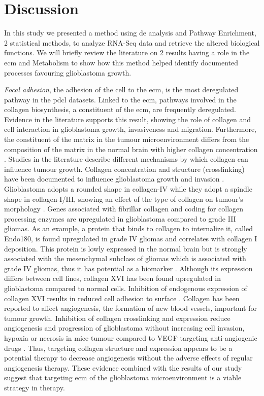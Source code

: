 \section{Discussion}

In this study we presented a method using \acrlong{de} analysis and Pathway Enrichment, 2 statistical methods, to analyze RNA-Seq data and retrieve the altered biological functions.
We will briefly review the literature on 2 results having a role in the \acrshort{ecm} and Metabolism to show how this method helped identify documented processes favouring glioblastoma growth.

\textit{Focal adhesion}, the adhesion of the cell to the \acrshort{ecm}, is the most deregulated pathway in the \acrshort{pdcl} datasets.
Linked to the \acrlong{ecm}, pathways involved in the collagen biosynthesis, a constituent of the \acrshort{ecm}, are frequently deregulated.
Evidence in the literature supports this result, showing the role of collagen and cell interaction in glioblastoma growth, invasiveness and migration.
Furthermore, the constituent of the matrix in the tumour microenvironment differs from the composition of the matrix in the normal brain with higher collagen concentration \cite*{Mammoto2013}.
Studies in the literature describe different mechanisms by which collagen can influence tumour growth.
Collagen concentration and structure (crosslinking) have been documented to influence glioblastoma growth and invasion \cite*{Kaphle2019,Kaufman2005,Rao2013}. 
Glioblastoma adopts a rounded shape in collagen-IV while they adopt a spindle shape in collagen-I/III, showing an effect of the type of collagen on tumour's morphology \cite*{Rao2013}.
Genes associated with fibrillar collagen and coding for collagen processing enzymes are upregulated in glioblastoma compared to grade III gliomas.
As an example, a protein that binds to collagen to internalize it, called Endo180, is found upregulated in grade IV gliomas and correlates with collagen I deposition. 
This protein is lowly expressed in the normal brain but is strongly associated with the mesenchymal subclass of gliomas which is associated with grade IV gliomas, thus it has potential as a biomarker \cite*{Huijbers2010}.
Although its expression differs between cell lines, collagen XVI has been found upregulated in glioblastoma compared to normal cells.
Inhibition of endogenous expression of collagen XVI results in reduced cell adhesion to surface \cite*{Senner2008}.
Collagen has been reported to affect angiogenesis, the formation of new blood vessels, important for tumour growth.
Inhibition of collagen crosslinking and expression reduce angiogenesis and progression of glioblastoma without increasing cell invasion, hypoxia or necrosis in mice tumour compared to VEGF targeting anti-angiogenic drugs \cite*{Mammoto2013}.
Thus, targeting collagen structure and expression appears to be a potential therapy to decrease angiogenesis without the adverse effects of regular angiogenesis therapy.
These evidence combined with the results of our study suggest that targeting \acrshort{ecm} of the glioblastoma microenvironment is a viable strategy in therapy.

